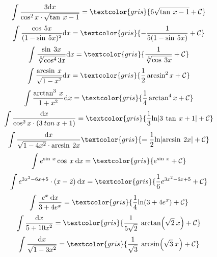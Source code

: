 {\begin{fleqn}
	\begin{equation}
		\int \frac{3 \mathrm{d}x}{\cos^2x\cdot \sqrt{\tan\:x-1}}=\textcolor{gris}{6\sqrt{\tan\:x-1}+\mathcal C}
	\end{equation}
	\begin{equation}
		\int \frac{\cos\: 5x}{(1-\sin\: 5x)^2}\mathrm{d}x=\textcolor{gris}{-\frac{1}{5(1-\sin\: 5x)}+\mathcal C}
	\end{equation}
	\begin{equation}
		\int \frac{\sin\: 3x}{\sqrt [3]{\cos^4 3x}}\mathrm{d}x=\textcolor{gris}{\frac{1}{\sqrt [3]{\cos\: 3x}}+ \mathcal C}
	\end{equation}
	\begin{equation}
		\int \frac{\arcsin\:x}{\sqrt{1-x^2}}\mathrm{d}x=\textcolor{gris}{\frac 1 2 \arcsin^2 x+\mathcal C}
	\end{equation}
	\begin{equation}
		\int \frac{\arctan^3\: x}{1+x^2}\mathrm{d}x=\textcolor{gris}{\frac 1 4 \arctan^4 x+\mathcal C}
	\end{equation}
	\begin{equation}
		\int \frac{\mathrm{d} x}{\cos^2 x \cdot (3\: tan\: x+1)}=\textcolor{gris}{\frac 1 3 \mathrm{ln} \abs{3\: \tan\: x+1}+\mathcal C}
	\end{equation}
	\begin{equation}
		\int \frac{\mathrm{d}x}{\sqrt{1-4x^2}\cdot \arcsin\: 2x}\textcolor{gris}{= \frac 1 2 \mathrm{ln} \abs{\arcsin \: 2x}+\mathcal C}
	\end{equation}
	\begin{equation}
		\int e^{\sin\: x}\cos\: x\: \mathrm{d}x=\textcolor{gris}{e^{\sin\:x}+\mathcal C}
	\end{equation}
	\begin{equation}
		\int e^{3x^2-6x+5}\cdot (x-2)\: \mathrm{d}x=\textcolor{gris}{\frac 1 6 e^{3x^2-6x+5}+\mathcal C}
	\end{equation}
	\begin{equation}
		\int \frac{e^x \: \mathrm{d}x}{3+4e^x}=\textcolor{gris}{\frac 1 4 \mathrm{ln} (3+4e^x)+\mathcal C}
	\end{equation}
	\begin{equation}
		\int \frac{\mathrm{d}x}{5+10x^2}=\textcolor{gris}{\frac{1}{5\sqrt{2}}\: \arctan(\sqrt{2}\: x)+\mathcal C}
	\end{equation}
	\begin{equation}
		\int \frac{\mathrm{d}x}{\sqrt{1-3x^2}}=\textcolor{gris}{\frac{1}{\sqrt{3}}\: \arcsin(\sqrt{3}\:x)+\mathcal C}

\end{equation}
\end{fleqn}}
